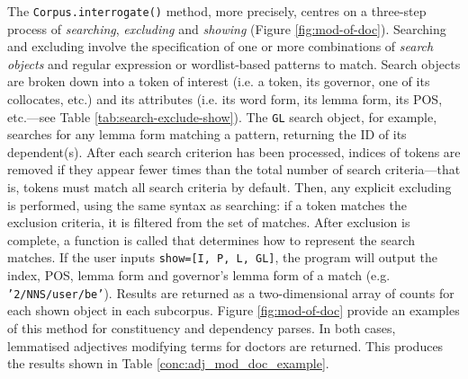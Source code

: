 The \texttt{Corpus.interrogate()} method, more precisely, centres on a three\hyp{}step process of \emph{searching}, \emph{excluding} and \emph{showing} (Figure \ref{fig:mod-of-doc}). Searching and excluding involve the specification of one or more combinations of \emph{search objects} and regular expression or wordlist\hyp{}based patterns to match. Search objects are broken down into a token of interest (i.e. a token, its governor, one of its collocates, etc.) and its attributes (i.e. its word form, its lemma form, its \gls{POS}, etc.---see Table \ref{tab:search-exclude-show}). The \texttt{GL} search object, for example, searches for any lemma form matching a pattern, returning the ID of its dependent(s). After each search criterion has been processed, indices of tokens are removed if they appear fewer times than the total number of search criteria---that is, tokens must match all search criteria by default. Then, any explicit excluding is performed, using the same syntax as searching: if a token matches the exclusion criteria, it is filtered from the set of matches. After exclusion is complete, a function is called that determines how to represent the search matches. If the user inputs \texttt{show=[I, P, L, GL]}, the program will output the index, \gls{POS}, lemma form and governor's lemma form of a match (e.g. \texttt{'2/NNS/user/be'}). Results are returned as a two\hyp{}dimensional array of counts for each shown object in each subcorpus. Figure \ref{fig:mod-of-doc} provide an examples of this method for constituency and dependency parses. In both cases, lemmatised adjectives modifying terms for doctors are returned. This produces the results shown in Table \ref{conc:adj_mod_doc_example}.

